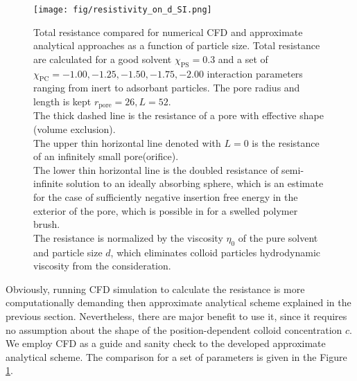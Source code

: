 \documentclass[10pt, a4paper]{article}
\begin{document}
\begin{multicols}{2}
\begin{figure}[H]
    \centering
    \texttt{[image: fig/resistivity\_on\_d\_SI.png]}
    \caption{
        Total resistance compared for numerical CFD and approximate analytical approaches as a function of particle size.
        Total resistance are calculated for a good solvent $\chi_{\textrm{PS}} = 0.3$ and a set of $\chi_{\textrm{PC}} = {-1.00, -1.25, -1.50, -1.75, -2.00}$ interaction parameters ranging from inert to adsorbant particles.
        The pore radius and length is kept $r_{\textrm{pore}} = 26, L = 52$.
        \\
        The thick dashed line is the resistance of a pore with effective shape (volume exclusion).
        \\
        The upper thin horizontal line denoted with $L=0$ is the resistance of an infinitely small pore(orifice).
        \\
        The lower thin horizontal line is the doubled resistance of semi-infinite solution to an ideally absorbing sphere, which is an estimate for the case of sufficiently negative insertion free energy in the exterior of the pore, which is possible in for a swelled polymer brush.
        \\
        The resistance is normalized by the viscosity $\eta_{0}$ of the pure solvent and particle size $d$, which  eliminates colloid particles hydrodynamic viscosity from the consideration.
        }
    \label{fig:CFD_comparison}
\end{figure}

Obviously, running CFD simulation to calculate the resistance is more computationally demanding then approximate analytical scheme explained in the previous section.
Nevertheless, there are major benefit to use it, since it requires no assumption about the shape of the position-dependent colloid concentration $c$.
We employ CFD as a guide and sanity check to the developed approximate analytical scheme.
The comparison for a set of parameters is given in the Figure \ref{fig:CFD_comparison}.


    
\end{multicols}



\end{document}
